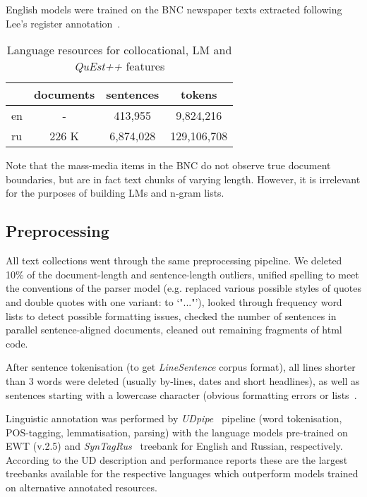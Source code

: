 English models were trained on the \gls{BNC} newspaper texts extracted following Lee's register annotation~\cite{Lee01}.

\begin{table}[]
	\centering
	\begin{tabular}{l|ccc}
	\toprule
		 & documents & sentences & tokens      \\
	\midrule
	en   & -         & 413,955   & 9,824,216   \\
	ru   & 226 K     & 6,874,028 & 129,106,708 \\ 
	\bottomrule
\end{tabular}
 \caption{\label{tab:lmres} Language resources for collocational, LM and \textit{QuEst++} features}
\end{table}

Note that the mass-media items in the BNC do not observe true document boundaries, but are in fact text chunks of varying length. However, it is irrelevant for the purposes of building LMs and n-gram lists.

\subsection{\label{ssec:prepro}Preprocessing}
All text collections went through the same preprocessing pipeline.
We deleted 10\% of the document-length and sentence-length outliers, unified spelling to meet the conventions of the parser model (e.g. replaced various possible styles of quotes and double quotes with one variant:  to `"..."'), looked through frequency word lists to detect possible formatting issues, checked the number of sentences in parallel sentence-aligned documents, cleaned out remaining fragments of html code.

After sentence tokenisation (to get \textit{LineSentence} corpus format), all lines shorter than 3 words were deleted (usually by-lines, dates and short headlines), as well as sentences starting with a lowercase character (obvious formatting errors or lists~\cite[see similar filtering rule in][]{Guzman2019}. 

Linguistic annotation was performed by \textit{UDpipe}~\cite[][v.1.2.0]{Straka2017}  pipeline (word tokenisation, POS-tagging, lemmatisation, parsing) with the language models pre-trained on \gls{EWT} (v.2.5) and \textit{SynTagRus}~\cite[v2.5,][]{Droganova2018} treebank for English and Russian, respectively. According to the UD description and performance reports these are the largest treebanks available for the respective languages which outperform models trained on alternative annotated resources.

